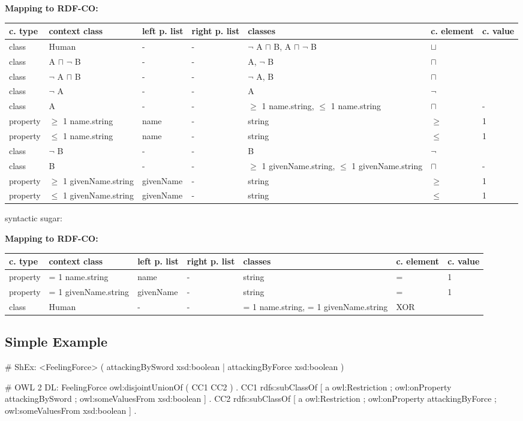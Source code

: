 \documentclass{llncs}
\newenvironment{gcotable}{
  \scriptsize
  \sffamily
  \vspace{0cm}
	\begin{center}
	\textbf{\vspace{0.4cm}Mapping to RDF-CO:} \\
  \begin{tabular}{l|l|l|l|l|l|l}
	\hline
  \textbf{c. type} & \textbf{context class} & \textbf{left p. list} & \textbf{right p. list} & \textbf{classes} & \textbf{c. element} & \textbf{c. value} \\
  \hline

}{
  \hline
  \end{tabular}
	\end{center}
}
\begin{document}
\begin{gcotable}
class & Human & - & - & $\neg$ A $\sqcap$ B, A $\sqcap$ $\neg$ B & $\sqcup$ \\
\hline
class & A $\sqcap$ $\neg$ B & - & - & A, $\neg$ B & $\sqcap$ \\
class & $\neg$ A $\sqcap$ B & - & - & $\neg$ A, B & $\sqcap$ \\
\hline
class & $\neg$ A & - & - & A & $\neg$ \\
class & A & - & - & $\geq$ 1 name.string, $\leq$ 1 name.string & $\sqcap$ & - \\
property & $\geq$ 1 name.string & name & - & string & $\geq$ & 1 \\
property & $\leq$ 1 name.string & name & - & string & $\leq$ & 1 \\
\hline
class & $\neg$ B & - & - & B & $\neg$ \\
class & B & - & - & $\geq$ 1 givenName.string, $\leq$ 1 givenName.string & $\sqcap$ & - \\
property & $\geq$ 1 givenName.string & givenName & - & string & $\geq$ & 1 \\
property & $\leq$ 1 givenName.string & givenName & - & string & $\leq$ & 1 \\
\end{gcotable}

syntactic sugar:
\begin{gcotable}
property & = 1 name.string & name & - & string & = & 1 \\
property & = 1 givenName.string & givenName & - & string & = & 1 \\
class & Human & - & - & = 1 name.string, = 1 givenName.string & XOR \\
\end{gcotable}

\subsection{Simple Example}

\begin{ex}
# ShEx:
<FeelingForce> { (  
    attackingBySword xsd:boolean | 
    attackingByForce xsd:boolean ) }
\end{ex}

\begin{ex}
# OWL 2 DL:
FeelingForce owl:disjointUnionOf ( CC1 CC2 ) . 
CC1 rdfs:subClassOf [
    a owl:Restriction ;
    owl:onProperty attackingBySword ;
    owl:someValuesFrom xsd:boolean ] .
CC2 rdfs:subClassOf [
    a owl:Restriction ;
    owl:onProperty attackingByForce ;
    owl:someValuesFrom xsd:boolean ] .
\end{ex}
\end{document}
